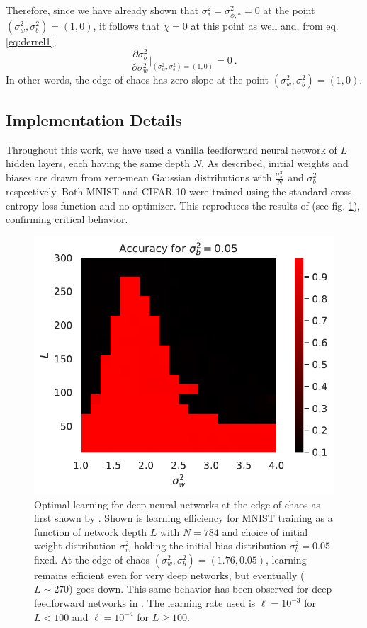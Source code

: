 %
Therefore, since we have already shown that $\sigma_{*}^{2} = \sigma_{\phi , *}^{2} = 0$ at the point $( \sigma_{w}^{2} , \sigma_{b}^{2} ) = (1,0)$, it follows that $\tilde{\chi} = 0$ at this point as well and, from eq. \eqref{eq:derrel1},
%
\begin{equation}
	\frac{\partial \sigma_{b}^{2}}{\partial \sigma_{w}^{2}} \biggr|_{( \sigma_{w}^{2} , \sigma_{b}^{2} ) = (1,0)} = 0~.
\end{equation}
%
In other words, the edge of chaos has zero slope at the point $( \sigma_{w}^{2} , \sigma_{b}^{2} ) = (1,0)$.

\subsection{Implementation Details}
\label{app:figs}

Throughout this work, we have used a vanilla feedforward neural network of $L$ hidden layers, each having the same depth $N$. As described, initial weights and biases are drawn from zero-mean Gaussian distributions with $\frac{\sigma_w^2}{N}$ and $\sigma_b^2$ respectively. Both MNIST and CIFAR-10 were trained using the standard cross-entropy loss function and no optimizer. This reproduces the results of \cite{2016arXiv161101232S} (see fig. \ref{fig:googleBrain-repro}), confirming critical behavior.
\begin{figure}[H]
	\centering
	\includegraphics[scale=.9]{figures/chapter4/googleGraph.pdf}
	\caption{Optimal learning for deep neural networks at the edge of chaos as first shown by \cite{2016arXiv161101232S}. Shown is learning efficiency for MNIST training as a function of network depth $L$ with $N=784$ and choice of initial weight distribution $\sigma_w^2$ holding the initial bias distribution $\sigma_b^2=0.05$ fixed. At the edge of chaos $(\sigma_w^2,\sigma_b^2)=(1.76,0.05)$, learning remains efficient even for very deep networks, but eventually ($L\sim 270$) goes down. This same behavior has been observed for deep feedforward networks in \cite{2016arXiv161101232S,Erdmenger:2021sot}. The learning rate used is $\ell = 10^{-3}$ for $L<100$ and $\ell=10^{-4}$ for $L\geq100$.}
	\label{fig:googleBrain-repro}
\end{figure}

